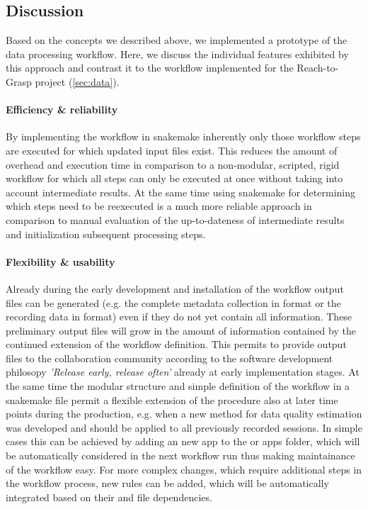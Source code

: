 \subsection{Discussion}
Based on the concepts we described above, we implemented a prototype of the data processing workflow. Here, we discuss the individual features exhibited by this approach and contrast it to the workflow implemented for the Reach-to-Grasp project (\cref{sec:data}).

\label{sec:workflow_discussion}
\paragraph{Efficiency \& reliability}
By implementing the workflow in snakemake inherently only those workflow steps are executed for which updated input files exist. This reduces the amount of overhead and execution time in comparison to a non-modular, scripted, rigid workflow for which all steps can only be executed at once without taking into account intermediate results.
At the same time using snakemake for determining which steps need to be reexecuted is a much more reliable approach in comparison to manual evaluation of the up-to-dateness of intermediate results and initialization subsequent processing steps.

\paragraph{Flexibility \& usability}
Already during the early development and installation of the workflow output files can be generated (e.g. the complete metadata collection in  format or the recording data in  format) even if they do not yet contain all information. These preliminary output files will grow in the amount of information contained by the continued extension of the workflow definition. This permits to provide output files to the collaboration community according to the software development philosopy \textit{'Release early, release often'} \citep{Martin_2008} already at early implementation stages. At the same time the modular structure and simple definition of the workflow in a snakemake file permit a flexible extension of the procedure also at later time points during the production, e.g. when a new method for data quality estimation was developed and should be applied to all previously recorded sessions. In simple cases this can be achieved by adding an new app to the  or  apps folder, which will be automatically considered in the next workflow run thus making maintainance of the workflow easy. For more complex changes, which require additional steps in the workflow process, new rules can be added, which will be automatically integrated based on their  and  file dependencies.

